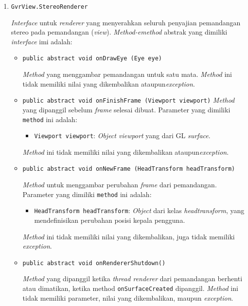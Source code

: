 	\begin{enumerate}
		\item \texttt{GvrView.StereoRenderer}
		
		\textit{Interface} untuk \textit{renderer} yang menyerahkan seluruh penyajian pemandangan stereo pada pemandangan (\textit{view}). \textit{Method-emethod} abstrak yang dimiliki \textit{interface} imi adalah:
			\begin{itemize}

				\item \texttt{public abstract void onDrawEye (Eye eye)}
				
\textit{Method} yang menggambar pemandangan untuk satu mata. \textit{Method} ini tidak memiliki nilai yang dikembalikan ataupun\textit{exception}. 

				\item \texttt{public abstract void onFinishFrame (Viewport viewport)}
\textit{Method} yang dipanggil sebelum \textit{frame} selesai dibuat. Parameter yang dimiliki \texttt{method} ini adalah:
				\begin{itemize}

					\item \texttt{Viewport viewport}: \textit{Object viewport} yang dari GL \textit{surface}.
				\end{itemize}
				
\textit{Method} ini tidak memiliki nilai yang dikembalikan ataupun\textit{exception}.
				
				\item \texttt{public abstract void onNewFrame (HeadTransform headTransform)}		
						
\textit{Method} untuk menggambar perubahan \textit{frame} dari pemandangan. Parameter yang dimiliki \texttt{method} ini adalah:

				\begin{itemize}
					\item \texttt{HeadTransform headTransform}: 						\textit{Object} dari kelas \textit{headtransform}, yang mendefinisikan perubahan posisi kepala pengguna.  
				\end{itemize}		
				\textit{Method} ini tidak memiliki nilai yang dikembalikan, juga tidak memiliki \textit{exception}. 						
				
				\item \texttt{public abstract void onRendererShutdown()}
				
\textit{Method} yang dipanggil ketika \textit{thread renderer} dari pemandangan berhenti atau dimatikan, ketika method \texttt{onSurfaceCreated} dipanggil. \textit{Method} ini tidak memiliki parameter, nilai yang dikembalikan, maupun \textit{exception}.
				

\end{itemize}
\end{enumerate}
